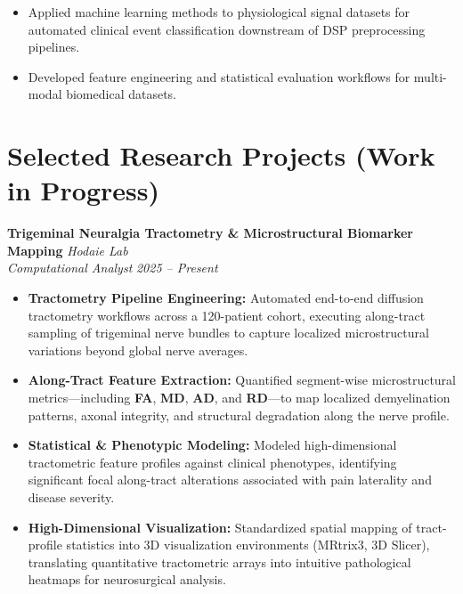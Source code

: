 \documentclass[11pt, letterpaper]{article}
\newcommand{\cventry}[4]{
    \noindent\textbf{#1} \hfill \textit{#2} \\
    \textit{#3} \hfill \textit{\small #4} \\
    \vspace{-4pt}
}
\begin{document}
\begin{itemize}[leftmargin=1.5em, topsep=2pt, itemsep=2pt]
    \item Applied machine learning methods to physiological signal datasets for automated clinical event classification downstream of DSP preprocessing pipelines.

    \item Developed feature engineering and statistical evaluation workflows for multi-modal biomedical datasets.
\end{itemize}

\section{Selected Research Projects (Work in Progress)}

\vspace{4pt}
\cventry{Trigeminal Neuralgia Tractometry \& Microstructural Biomarker Mapping}{Hodaie Lab}{Computational Analyst}{2025 -- Present}

\begin{itemize}[leftmargin=1.5em, topsep=2pt, itemsep=2pt]
    \item \textbf{Tractometry Pipeline Engineering:} Automated end-to-end diffusion tractometry workflows across a 120-patient cohort, executing along-tract sampling of trigeminal nerve bundles to capture localized microstructural variations beyond global nerve averages.

    \item \textbf{Along-Tract Feature Extraction:} Quantified segment-wise microstructural metrics—including \textbf{FA}, \textbf{MD}, \textbf{AD}, and \textbf{RD}—to map localized demyelination patterns, axonal integrity, and structural degradation along the nerve profile.

    \item \textbf{Statistical \& Phenotypic Modeling:} Modeled high-dimensional tractometric feature profiles against clinical phenotypes, identifying significant focal along-tract alterations associated with pain laterality and disease severity.

    \item \textbf{High-Dimensional Visualization:} Standardized spatial mapping of tract-profile statistics into 3D visualization environments (MRtrix3, 3D Slicer), translating quantitative tractometric arrays into intuitive pathological heatmaps for neurosurgical analysis.
\end{itemize}
\vspace{4pt}
\end{document}
